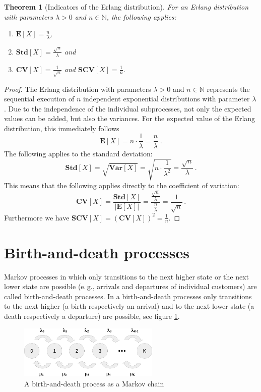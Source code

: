 \documentclass[a4paper,11pt,oneside]{article}
\newtheorem{theorem}{Theorem}
\theoremstyle{definition}
\begin{document}
\begin{theorem}[Indicators of the Erlang distribution]
For an Erlang distribution with parameters $\lambda>0$ and $n\in\mathbb{N}$, the following applies:
\begin{enumerate}
\item $\mathbf{E}[X]=\frac{n}{\lambda}$,
\item $\mathbf{Std}[X]=\frac{\sqrt{n}}{\lambda}$ and
\item $\mathbf{CV}[X]=\frac{1}{\sqrt{n}}$ and $\mathbf{SCV}[X]=\frac{1}{n}$.
\end{enumerate}
\end{theorem}

\begin{proof}
The Erlang distribution with parameters $\lambda>0$ and $n\in\mathbb{N}$ represents the sequential execution of $n$ independent exponential distributions with parameter $\lambda$. Due to the independence of the individual subprocesses, not only the expected values can be added, but also the variances. For the expected value of the Erlang distribution, this immediately follows
$$
\mathbf{E}[X]=n\cdot\frac{1}{\lambda}=\frac{n}{\lambda}\;.
$$
The following applies to the standard deviation:
$$
\mathbf{Std}[X]=\sqrt{\mathbf{Var}[X]}=\sqrt{n\cdot\frac{1}{\lambda^2}}=\frac{\sqrt{n}}{\lambda}\,.
$$
This means that the following applies directly to the coefficient of variation:
$$
\mathbf{CV}[X]=\frac{\mathbf{Std}[X]}{|\mathbf{E}[X]|}=\frac{\frac{\sqrt{n}}{\lambda}}{\frac{n}{\lambda}}=\frac{1}{\sqrt{n}}\,.
$$
Furthermore we have $\mathbf{SCV}[X]=\left(\mathbf{CV}[X]\right)^2=\frac{1}{n}$.
\end{proof}



\section{Birth-and-death processes}\label{BirthAndDeathProcesses}

Markov processes in which only transitions to the next higher state or the next lower state are possible (e.\,g., arrivals and departures of individual customers) are called birth-and-death processes. In a birth-and-death processes only transitions to the next higher (a birth respectively an arrival) and to the next lower state (a death respectively a departure) are possible, see figure \ref{fig:BirthAndDEathProcess}.

\begin{figure}[H]
\begin{center}
\includegraphics[width=0.6\textwidth]{ProofOfTheErlangCFormula-MarkovChain.pdf}
\end{center}
\caption{A birth-and-death process as a Markov chain}
\label{fig:BirthAndDEathProcess}
\end{figure}
\end{document}

